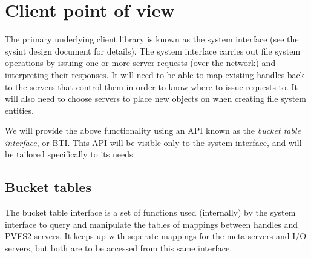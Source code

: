 \documentclass[12pt]{article} %
\begin{document}
\section{Client point of view}
\label{sec:client}

The primary underlying client library is known as the system interface
(see the sysint design document for details).  The system interface
carries out file system operations by issuing one or more server requests
(over the network) and interpreting their responses.  It will need to be
able to map existing handles back to the servers that control them in
order to know where to issue requests to.  It will also need to choose
servers to place new objects on when creating file system entities.

We will provide the above functionality using an API known as the
\emph{bucket table interface}, or BTI.  This API will be visible only to
the system interface, and will be tailored specifically to its needs.

\subsection{Bucket tables}

The bucket table interface is a set of functions used
(internally) by the system interface to query and manipulate the
tables of mappings between handles and PVFS2 servers.  It keeps up
with seperate mappings for the meta servers and I/O servers, but
both are to be accessed from this same interface.
\end{document}
